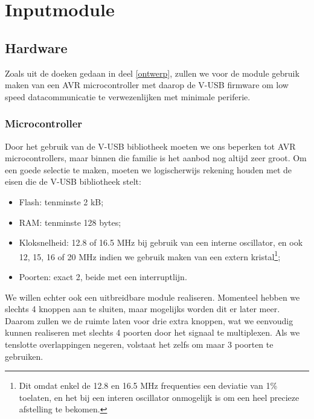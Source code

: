 \part{Inputmodule}
\label{inputmodule}

\chapter{Hardware}
\label{inputmodule:hardware}

Zoals uit de doeken gedaan in deel \ref{ontwerp}, zullen we voor de module gebruik maken van een AVR microcontroller met daarop de V-USB firmware om low speed datacommunicatie te verwezenlijken met minimale periferie.

\section{Microcontroller}
\label{inputmodule:hardware:microcontroller}

Door het gebruik van de V-USB bibliotheek moeten we ons beperken tot AVR microcontrollers, maar binnen die familie is het aanbod nog altijd zeer groot. Om een goede selectie te maken, moeten we logischerwijs rekening houden met de eisen die de V-USB bibliotheek stelt:
\begin{itemize}
\item Flash: tenminste 2 kB;
\item RAM: tenminste 128 bytes;
\item Kloksnelheid: 12.8 of 16.5 MHz bij gebruik van een interne oscillator, en ook 12, 15, 16 of 20 MHz indien we gebruik maken van een extern kristal\footnote{Dit omdat enkel de 12.8 en 16.5 MHz frequenties een deviatie van 1\% toelaten, en het bij een interen oscillator onmogelijk is om een heel precieze afstelling te bekomen.};
\item Poorten: exact 2, beide met een interruptlijn.
\end{itemize}

We willen echter ook een uitbreidbare module realiseren. Momenteel hebben we slechts 4 knoppen aan te sluiten, maar mogelijks worden dit er later meer. Daarom zullen we de ruimte laten voor drie extra knoppen, wat we eenvoudig kunnen realiseren met slechts 4 poorten door het signaal te multiplexen. Als we tenslotte overlappingen negeren, volstaat het zelfs om maar 3 poorten te gebruiken.

